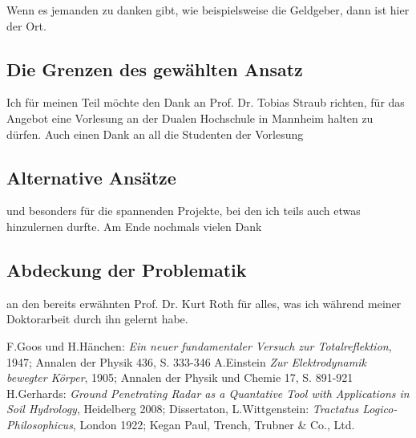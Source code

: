 \documentclass[10pt,twocolumn]{scrartcl}
\begin{document}
Wenn es jemanden zu danken gibt, wie beispielsweise die Geldgeber, 
dann ist hier der Ort.

\subsection{Die Grenzen des gewählten Ansatz}

Ich für meinen Teil möchte den Dank an Prof. Dr. Tobias Straub
richten, für das Angebot eine Vorlesung an der Dualen Hochschule in
Mannheim halten zu dürfen. Auch einen Dank an all die Studenten der Vorlesung

\subsection{Alternative Ansätze}

und besonders für die spannenden Projekte, bei den ich teils auch 
etwas hinzulernen durfte. Am Ende nochmals vielen Dank 

\subsection{Abdeckung der Problematik}

an den bereits erwähnten Prof. Dr. Kurt Roth für alles, 
was ich während meiner Doktorarbeit durch ihn gelernt habe.

\begin{thebibliography}{99}
F.Goos und H.Hänchen: {\it Ein neuer fundamentaler Versuch zur Totalreflektion}, 1947; Annalen der Physik 436, S. 333-346
A.Einstein {\it Zur Elektrodynamik bewegter Körper}, 1905; Annalen der Physik und Chemie 17, S. 891-921
H.Gerhards: {\it Ground Penetrating Radar as a Quantative Tool with Applications in Soil Hydrology}, Heidelberg 2008; Dissertaton,
L.Wittgenstein: {\it Tractatus Logico-Philo\-so\-phi\-cus}, London 1922; Kegan Paul, Trench, Trubner \& Co., Ltd.
\end{thebibliography}
\end{document}

